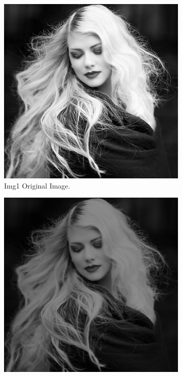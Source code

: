 \documentclass[14pt]{article}
\begin{document}
	\begin{figure}[hbt!]
		\centering
		\begin{subfigure}[b]{0.23\linewidth}
			\includegraphics[width=\linewidth]{origin1.png}
			\caption{Img1 Original Image.}
		\end{subfigure}
		\begin{subfigure}[b]{0.23\linewidth}
			\includegraphics[width=\linewidth]{ones3.png}

\end{subfigure}
\end{figure}
\end{document}
